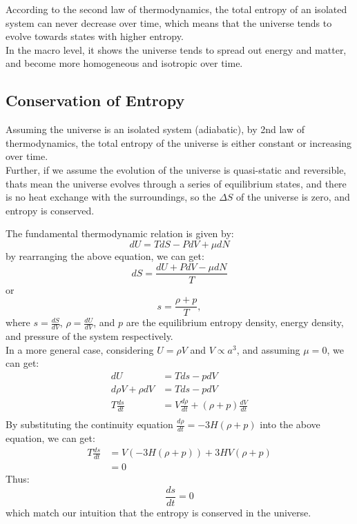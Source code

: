\bigskip\noindent
\begin{intuition}
    According to the second law of thermodynamics, the total entropy of an isolated system can never decrease over time, which means that the universe tends to evolve towards states with higher entropy. \\
    
    In the macro level, it shows the universe tends to spread out energy and matter, and become more homogeneous and isotropic over time.
\end{intuition}

\bigskip\noindent \bigskip\noindent \bigskip\noindent
\subsection{Conservation of Entropy}
\begin{intuition}
    Assuming the universe is an isolated system (adiabatic), by 2nd law of thermodynamics, the total entropy of the universe is either constant or increasing over time. \\

    Further, if we assume the evolution of the universe is quasi-static and reversible, thats mean the universe evolves through a series of equilibrium states, and there is no heat exchange with the surroundings, so the $\Delta S$ of the universe is zero, and entropy is conserved. \\
\end{intuition}

\bigskip\noindent
\begin{theory}
    The fundamental thermodynamic relation is given by:
    \[
        dU = TdS - PdV + \mu dN
    \]
    by rearranging the above equation, we can get:
    \[
        dS = \frac{dU + PdV - \mu dN}{T} 
    \]
    or
    \[
        s = \frac{\rho + p}{T},
    \]
    where $s = \frac{dS}{dV}$, $\rho = \frac{dU}{dV}$, and $p$ are the equilibrium entropy density, energy density, and pressure of the system respectively. \\

    In a more general case, considering $U = \rho V$ and $V \propto a^3$, and assuming $\mu = 0$, we can get:
    \begin{align*}
        dU &= Tds - pdV\\
        d\rho V + \rho dV &= Tds - pdV \\
        T\frac{ds}{dt} &= V \frac{d\rho}{dt} + (\rho + p) \frac{dV}{dt} \\
    \end{align*}
    By substituting the continuity equation $\frac{d\rho}{dt} = -3H(\rho + p)$ into the above equation, we can get:
    \begin{align*}
        T\frac{ds}{dt}
        &= V (-3H(\rho + p)) + 3H V (\rho + p) \\
        &= 0
    \end{align*}
    Thus:
    \[
        \frac{ds}{dt} = 0
    \]
    which match our intuition that the entropy is conserved in the universe.
\end{theory}

